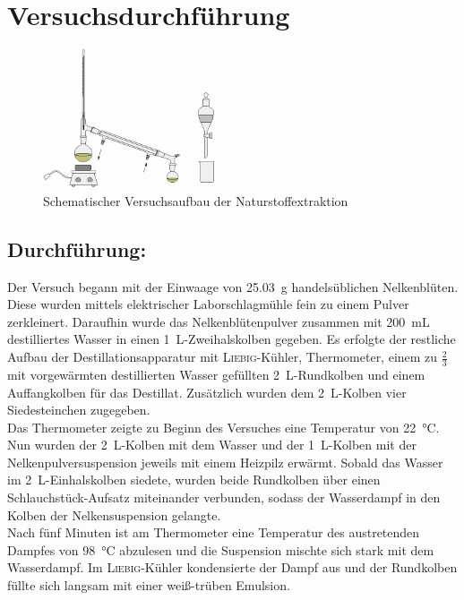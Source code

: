 \section{Versuchsdurchführung}
\label{sec:durchfuerung}
\begin{figure}[h!]
	\centering
	\includegraphics[width=0.45\textwidth]{img/versuchsaufbau_1}
	\caption{Schematischer Versuchsaufbau der Naturstoffextraktion}
	\label{fig:versuchsaufbau_1}
\end{figure}
\FloatBarrier

\subsection*{Durchführung:}

Der Versuch begann mit der Einwaage von \SI{25,03}{\gram} handelsüblichen Nelkenblüten. Diese wurden mittels elektrischer Laborschlagmühle fein zu einem Pulver zerkleinert.
Daraufhin wurde das Nelkenblütenpulver zusammen mit \SI{200 }{\milli \liter} destilliertes Wasser in einen \SI{1}{\liter}-Zweihalskolben gegeben.
Es erfolgte der restliche Aufbau der Destillationsapparatur mit \textsc{ Liebig}-Kühler, Thermometer, einem zu $\frac{2}{3}$ mit vorgewärmten destillierten Wasser gefüllten \SI{2}{\liter}-Rundkolben und einem Auffangkolben für das Destillat.
Zusätzlich wurden dem \SI{2}{\liter}-Kolben vier Siedesteinchen zugegeben.\\
Das Thermometer zeigte zu Beginn des Versuches eine Temperatur von \SI{22}{\celsius}.\\
Nun wurden der \SI{2}{\liter}-Kolben mit dem Wasser und der \SI{1}{\liter}-Kolben mit der Nelkenpulversuspension jeweils mit einem Heizpilz erwärmt.
Sobald das Wasser im \SI{2}{\liter}-Einhalskolben siedete, wurden beide Rundkolben über einen Schlauchstück-Aufsatz miteinander verbunden, sodass der Wasserdampf in den Kolben der Nelkensuspension gelangte.\\
Nach fünf Minuten ist am Thermometer eine Temperatur des austretenden Dampfes von \SI{98}{\celsius} abzulesen und die Suspension mischte sich stark mit dem Wasserdampf.
Im \textsc{Liebig}-Kühler kondensierte der Dampf aus und der Rundkolben füllte sich langsam mit einer weiß-trüben Emulsion.\\

